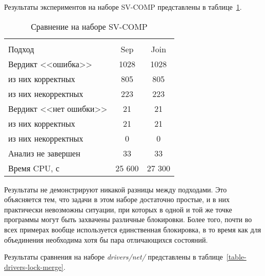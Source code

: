 Результаты экспериментов на наборе SV-COMP представлены в таблице~\ref{table-svcomp-lock-merge}.

  \begin{table}[h]\footnotesize \centering
    \caption{Сравнение на наборе SV-COMP}
  	\label{table-svcomp-lock-merge}
    \begin{tabular}{ | l | c | c |}
      \hline
      		& 		\multicolumn{2}{c|}{\theory}  \\
      Подход         				&  Sep		& Join 		\\ \hline
      Вердикт <<ошибка>> 			& 1028   	& 1028   	\\ 
  \hspace{0.5cm} из них корректных 	& 805 		& 805 	 	\\ 
  \hspace{0.5cm} из них некорректных & 223 		& 223 	   	\\ \hline
      Вердикт <<нет ошибки>>  		& 21    	& 21     	\\ 
  \hspace{0.5cm} из них корректных 	& 21 		& 21    	\\
  \hspace{0.5cm} из них некорректных & 0 		& 0    	  	\\ \hline
      Анализ не завершен       		& 33    	& 33      	\\ \hline
      Время CPU, с   				& 25 600 	& 27 300  	\\ 
      \hline
    \end{tabular}
  \end{table}

Результаты не демонстрируют никакой разницы между подходами.
Это объясняется тем, что задачи в этом наборе достаточно простые, и в них практически невозможны ситуации, при которых в одной и той же точке программы могут быть захвачены различные блокировки.
Более того, почти во всех примерах вообще используется единственная блокировка, в то время как для объединения необходима хотя бы пара отличающихся состояний.

Результаты сравнения на наборе \textit{drivers/net/} представлены в таблице~\ref{table-drivers-lock-merge}.

